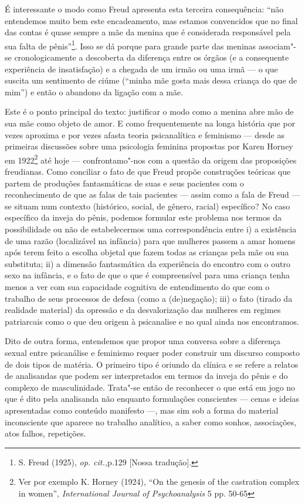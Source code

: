 É interessante o modo como Freud apresenta esta terceira consequência:
``não entendemos muito bem este encadeamento, mas estamos convencidos
que no final das contas é quase sempre a mãe da menina que é considerada
responsável pela sua falta de pênis''\footnote{S. Freud (1925),
  \emph{op. cit.,}p.129 {[}Nossa tradução{]}.}. Isso se dá porque para
grande parte das meninas associam"-se cronologicamente a descoberta da
diferença entre os órgãos (e a consequente experiência de insatisfação)
e a chegada de um irmão ou uma irmã --- o que suscita um sentimento de
ciúme (``minha mãe gosta mais dessa criança do que de mim'') e então o
abandono da ligação com a mãe.

Este é o ponto principal do texto: justificar o modo como a menina abre
mão de sua mãe como objeto de amor. E como frequentemente na longa
história que por vezes aproxima e por vezes afasta teoria psicanalítica
e feminismo --- desde as primeiras discussões sobre uma psicologia
feminina propostas por Karen Horney em 1922\footnote{Ver por exemplo K.
  Horney (1924), ``On the genesis of the castration complex in women'',
  \emph{International Journal of Psychoanalysis} 5 pp. 50-65} até hoje
--- confrontamo"-nos com a questão da origem das proposições freudianas.
Como conciliar o fato de que Freud propõe construções teóricas que
partem de produções fantasmáticas de suas e seus pacientes com o
reconhecimento de que as falas de tais pacientes --- assim como a fala de
Freud --- se situam num contexto (histórico, social, de gênero, racial)
específico? No caso específico da inveja do pênis, podemos formular
este problema nos termos da possibilidade ou não de estabelecermos uma
correspondência entre i) a existência de uma razão (localizável na
infância) para que mulheres passem a amar homens após terem feito a
escolha objetal que fazem todas as crianças pela mãe ou sua substituta;
ii) a dimensão fantasmática da experiência do encontro com o outro sexo
na infância, e o fato de que o que é compreensível para uma criança
tenha menos a ver com sua capacidade cognitiva de entendimento do que
com o trabalho de seus processos de defesa (como a (de)negação); iii) o
fato (tirado da realidade material) da opressão e da desvalorização das
mulheres em regimes patriarcais como o que deu origem à psicanalise e no
qual ainda nos encontramos.

Dito de outra forma, entendemos que propor uma conversa sobre a
diferença sexual entre psicanálise e feminismo requer poder construir um
discurso composto de dois tipos de matéria. O primeiro tipo é oriundo da
clínica e se refere a relatos de analisandas que podem ser interpretados
em termos da inveja do pênis e do complexo de masculinidade. Trata"-se
então de reconhecer o que está em jogo no que é dito pela analisanda não
enquanto formulações conscientes --- cenas e ideias apresentadas como
conteúdo manifesto ---, mas sim sob a forma do material inconsciente que
aparece no trabalho analítico, a saber como sonhos, associações, atos
falhos, repetições.

